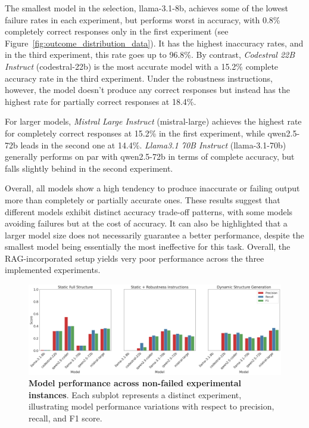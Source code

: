\documentclass{DESSThesis}
\begin{document}
The smallest model in the selection, llama-3.1-8b, achieves some of the lowest failure rates in each experiment, but performs worst in accuracy, with 0.8\% completely correct responses only in the first experiment (see Figure~\ref{fig:outcome_distribution_data}). It has the highest inaccuracy rates, and in the third experiment, this rate goes up to 96.8\%. By contrast, \emph{Codestral 22B Instruct} (codestral-22b) is the most accurate model with a 15.2\% complete accuracy rate in the third experiment. Under the robustness instructions, however, the model doesn't produce any correct responses but instead has the highest rate for partially correct responses at 18.4\%.

For larger models, \emph{Mistral Large Instruct} (mistral-large) achieves the highest rate for completely correct responses at 15.2\% in the first experiment, while qwen2.5-72b leads in the second one at 14.4\%. \emph{Llama3.1 70B Instruct} (llama-3.1-70b) generally performs on par with qwen2.5-72b in terms of complete accuracy, but falls slightly behind in the second experiment.

Overall, all models show a high tendency to produce inaccurate or failing output more than completely or partially accurate ones. These results suggest that different models exhibit distinct accuracy trade-off patterns, with some models avoiding failures but at the cost of accuracy. It can also be highlighted that a larger model size does not necessarily guarantee a better performance, despite the smallest model being essentially the most ineffective for this task. Overall, the RAG-incorporated setup yields very poor performance across the three implemented experiments.

\begin{figure}[ht]
    \centering
    \includegraphics[width=\linewidth]{img/Results/First Experimental Phase/Evaluation of Model Performance Across Experiments.png}
    \caption[Model performance across non-failed experimental instances]{\textbf{Model performance across non-failed experimental instances}. Each subplot represents a distinct experiment, illustrating model performance variations with respect to precision, recall, and F1 score.}
    \label{fig:model_performance_nonfailed}
\end{figure}
\end{document}
